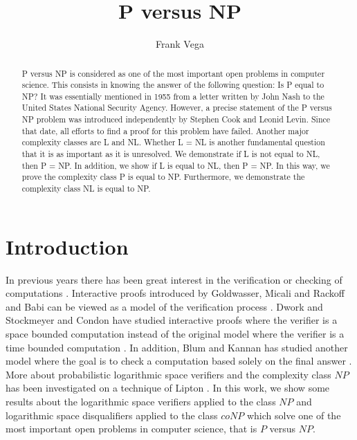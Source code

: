\documentclass[a4paper,UKenglish,cleveref, autoref]{lipics-v2019}
\title{P versus NP} %
\author{Frank Vega}{Joysonic, Uzun Mirkova 5, Belgrade, 11000, Serbia} {vega.frank@gmail.com}{https://orcid.org/0000-0001-8210-4126}{}
\begin{document}
\maketitle

\begin{abstract}
P versus NP is considered as one of the most important open problems in computer science. This consists in knowing the answer of the following question: Is P equal to NP? It was essentially mentioned in 1955 from a letter written by John Nash to the United States National Security Agency. However, a precise statement of the P versus NP problem was introduced independently by Stephen Cook and Leonid Levin. Since that date, all efforts to find a proof for this problem have failed. Another major complexity classes are L and NL. Whether L = NL is another fundamental question that it is as important as it is unresolved. We demonstrate if L is not equal to NL, then P = NP. In addition, we show if L is equal to NL, then P = NP. In this way, we prove the complexity class P is equal to NP. Furthermore, we demonstrate the complexity class NL is equal to NP.
\end{abstract}

\section{Introduction}

In previous years there has been great interest in the verification or checking of computations \cite{LIP90}. Interactive proofs introduced by Goldwasser, Micali and Rackoff and Babi can be viewed as a model of the verification process \cite{LIP90}. Dwork and Stockmeyer and Condon have studied interactive proofs where the verifier is a space bounded computation instead of the original model where the verifier is a time bounded computation \cite{LIP90}. In addition, Blum and Kannan has studied another model where the goal is to check a computation based solely on the final answer \cite{LIP90}. More about probabilistic logarithmic space verifiers and the complexity class $NP$ has been investigated on a technique of Lipton \cite{LIP90}. In this work, we show some results about the logarithmic space verifiers applied to the class $NP$ and logarithmic space disqualifiers applied to the class $coNP$ which solve one of the most important open problems in computer science, that is $P$ versus $NP$.
\end{document}
